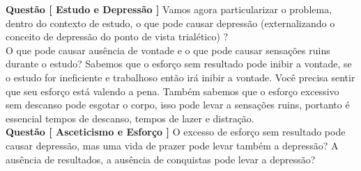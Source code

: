 \documentclass[10pt,a4paper]{report}
\begin{document}


\textbf{Questão [ Estudo e Depressão ]} Vamos agora particularizar o problema, dentro do contexto de estudo, o que pode causar depressão (externalizando o conceito de depressão do ponto de vista trialético) ?\\

O que pode causar ausência de vontade e o que pode causar sensações ruins durante o estudo? Sabemos que o esforço sem resultado pode inibir a vontade, se o estudo for ineficiente e trabalhoso então irá inibir a vontade. Você precisa sentir que seu esforço está valendo a pena. Também sabemos que o esforço excessivo sem descanso pode esgotar o corpo, isso pode levar a sensações ruins, portanto é essencial tempos de descanso, tempos de lazer e distração.\\


\textbf{Questão [ Asceticismo e Esforço ]} O excesso de esforço sem resultado pode causar depressão, mas uma vida de prazer pode levar também a depressão? A ausência de resultados, a ausência de conquistas pode levar a depressão?\\
\end{document}
